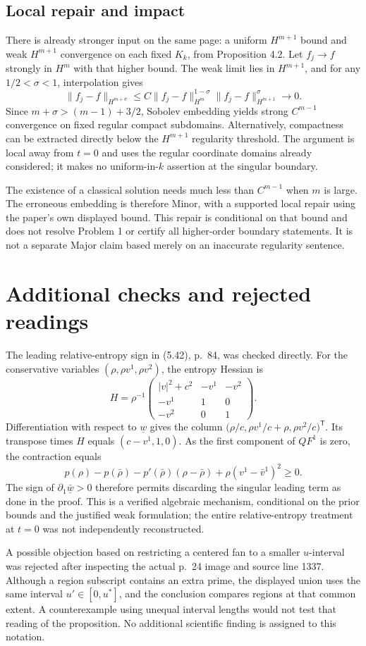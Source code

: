 \documentclass[10pt]{article}
\begin{document}
\subsection*{Local repair and impact}
There is already stronger input on the same page: a uniform \(H^{m+1}\) bound and weak \(H^{m+1}\) convergence on each fixed \(K_k\), from Proposition 4.2. Let \(f_j\to f\) strongly in \(H^m\) with that higher bound. The weak limit lies in \(H^{m+1}\), and for any \(1/2<\sigma<1\), interpolation gives \[\|f_j-f\|_{H^{m+\sigma}}
\leq C\|f_j-f\|_{H^m}^{1-\sigma}
      \|f_j-f\|_{H^{m+1}}^\sigma\longrightarrow0.\] Since \(m+\sigma>(m-1)+3/2\), Sobolev embedding yields strong \(C^{m-1}\) convergence on fixed regular compact subdomains. Alternatively, compactness can be extracted directly below the \(H^{m+1}\) regularity threshold. The argument is local away from \(t=0\) and uses the regular coordinate domains already considered; it makes no uniform-in-\(k\) assertion at the singular boundary.\par
The existence of a classical solution needs much less than \(C^{m-1}\) when \(m\) is large. The erroneous embedding is therefore Minor, with a supported local repair using the paper’s own displayed bound. This repair is conditional on that bound and does not resolve Problem 1 or certify all higher-order boundary statements. It is not a separate Major claim based merely on an inaccurate regularity sentence.\par
\section*{Additional checks and rejected readings}
The leading relative-entropy sign in (5.42), p. 84, was checked directly. For the conservative variables \((\rho,\rho v^1,\rho v^2)\), the entropy Hessian is \[H=\rho^{-1}
\begin{pmatrix}|v|^2+c^2&-v^1&-v^2\\-v^1&1&0\\-v^2&0&1\end{pmatrix}.\] Differentiation with respect to \(\underline{w}\) gives the column \(\big(\rho/c,\rho v^1/c+\rho,\rho v^2/c\big)^\mathsf T\). Its transpose times \(H\) equals \((c-v^1,1,0)\). As the first component of \(QF^1\) is zero, the contraction equals \[p(\rho)-p(\bar\rho)-p'(\bar\rho)(\rho-\bar\rho)
+\rho(v^1-\bar v^1)^2\geq0.\] The sign of \(\partial_1\bar{\underline{w}}>0\) therefore permits discarding the singular leading term as done in the proof. This is a verified algebraic mechanism, conditional on the prior bounds and the justified weak formulation; the entire relative-entropy treatment at \(t=0\) was not independently reconstructed.\par
A possible objection based on restricting a centered fan to a smaller \(u\)-interval was rejected after inspecting the actual p. 24 image and source line 1337. Although a region subscript contains an extra prime, the displayed union uses the same interval \(u'\in[0,u^*]\), and the conclusion compares regions at that common extent. A counterexample using unequal interval lengths would not test that reading of the proposition. No additional scientific finding is assigned to this notation.\par
\end{document}
